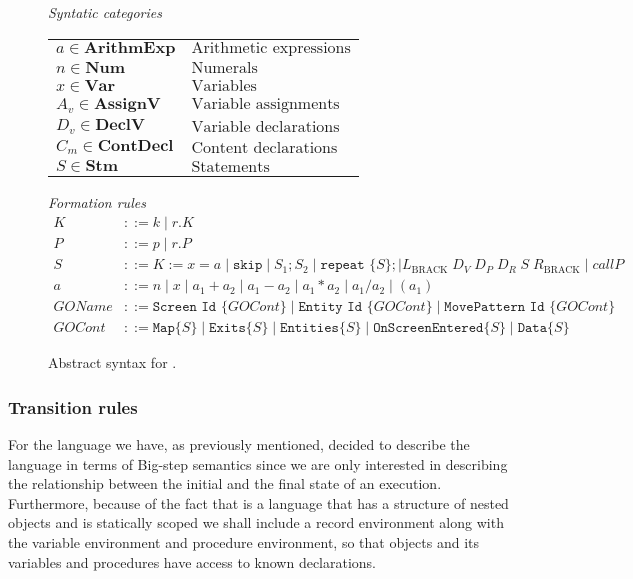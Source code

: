 \begin{figure}[h]
	\centering
	\textit{Syntatic categories}
	\vspace{4mm}


	\begin{tabular}{l l}
		$a \in \textbf{ArithmExp}$ & $\text{Arithmetic expressions}$ \\ 
		$n \in \textbf{Num}$ & $\text{Numerals}$ \\
		$x \in \textbf{Var}$ & $\text{Variables}$ \\
		$A_v \in \textbf{AssignV}$ & $\text{Variable assignments}$ \\
		$D_v \in \textbf{DeclV}$ & $\text{Variable declarations}$ \\
		$C_m \in \textbf{ContDecl}$ & $\text{Content declarations}$ \\
		$S \in \textbf{Stm}$ & $\text{Statements}$
	\end{tabular}

	\vspace{4mm}
	\textit{Formation rules}
	\begin{align*}
		K&::=k\mid r.K \\
		P&::=p\mid r.P \\
		S&::=K:=x=a\mid \texttt{skip}\mid S_1;S_2\mid \texttt{repeat }\{S\}; \mid L_\text{BRACK} \; D_V \; D_P \; D_R \; S \; R_\text{BRACK}\mid call P\\
		a&::=n\mid x\mid a_1+a_2\mid a_1-a_2\mid a_1*a_2\mid a_1/a_2\mid (a_1) \\
		GOName&::= \texttt{Screen} \texttt{ Id } \{GOCont\} \mid \texttt{Entity} \texttt{ Id } \{GOCont\} \mid \texttt{MovePattern} \texttt{ Id } \{GOCont\} \\
		GOCont&::= \texttt{Map} \{S\} \mid \texttt{Exits} \{S\} \mid \texttt{Entities} \{S\} \mid \texttt{OnScreenEntered} \{S\} \mid \texttt{Data} \{S\}
	\end{align*}

	\caption{Abstract syntax for \dazel{}.}
	\label{fig:AbstractSyntax}
\end{figure}

\subsubsection*{Transition rules}

For the language \dazel{} we have, as previously mentioned, decided to describe the language in terms of Big-step semantics since we are only interested in describing the relationship between the initial and the final state of an execution\cite{SemanWithApplications}. Furthermore, because of the fact that \dazel{} is a language that has a structure of nested objects and is statically scoped we shall include a record environment along with the variable environment and procedure environment, so that objects and its variables and procedures have access to known declarations.

